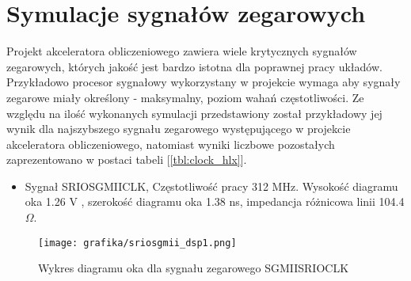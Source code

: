 \section{Symulacje sygnałów zegarowych}
Projekt akceleratora obliczeniowego zawiera wiele krytycznych sygnałów zegarowych, których jakość jest bardzo istotna dla poprawnej pracy układów. Przykładowo procesor sygnałowy wykorzystany w projekcie wymaga aby sygnały zegarowe miały określony - maksymalny, poziom wahań częstotliwości. Ze względu na ilość wykonanych symulacji przedstawiony został przykładowy jej wynik dla najszybszego sygnału zegarowego występującego w projekcie akceleratora obliczeniowego, natomiast wyniki liczbowe pozostałych zaprezentowano w postaci tabeli [\ref{tbl:clock_hlx}]. 

%
%
%
%


\begin{itemize}
\item Sygnał SRIOSGMIICLK, Częstotliwość pracy 312 MHz. Wysokość diagramu oka 1.26 V , szerokość diagramu oka 1.38 ns, impedancja różnicowa linii 104.4 $\Omega$. 

\end{itemize}

\begin{figure}[!ht]
\begin{center}
\texttt{[image: grafika/sriosgmii\_dsp1.png]}
\end{center}
\caption{Wykres diagramu oka dla sygnału zegarowego SGMIISRIOCLK}
\end{figure}



